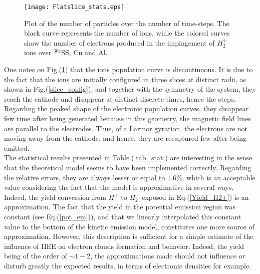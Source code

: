 \begin{figure}[h!]
\centering
	\texttt{[image: Flatslice\_stats.eps]}
	\caption{\label{flat_slice} Plot of the number of particles over the number of time-steps. The black curve represents the number of ions, while the colored curves show the number of electrons produced in the impingement of $H_2^+$ ions over $^{304}$SS, Cu and Al.}
\end{figure}  

\noindent One notes on Fig.(\ref{flat_slice}) that the ions population curve is discontinuous. It is due to the fact that the ions are initially configured in three slices at distinct radii, as shown in Fig.(\ref{slice_config}), and together with the symmetry of the system, they reach the cathode and disappear at distinct discrete times, hence the steps. Regarding the peaked shape of the electronic population curves, they disappear few time after being generated because in this geometry, the magnetic field lines are parallel to the electrodes. Thus, of a Larmor gyration, the electrons are not moving away from the cathode, and hence, they are recaptured few after being emitted.\\

The statistical results presented in Table.(\ref{tab_stat}) are interesting in the sense that the theoretical model seems to have been implemented correctly. Regarding the relative errors, they are always lesser or equal to $1.6\%$, which is an acceptable value considering the fact that the model is approximative in several ways. Indeed, the yield conversion from $H^+$ to $H_2^{+}$ exposed in Eq.(\ref{Yield_H2+}) is an approximation. The fact that the yield in the potential emission region was constant (see Eq.(\ref{pot_em})), and that we linearly interpolated this constant value to the bottom of the kinetic emission model, constitutes one more source of approximation. However, this description is sufficient for a simple estimate of the influence of IIEE on electron clouds formation and behavior. Indeed, the yield being of the order of $\sim 1-2$, the approximations made should not influence or disturb greatly the expected results, in terms of electronic densities for example. 

